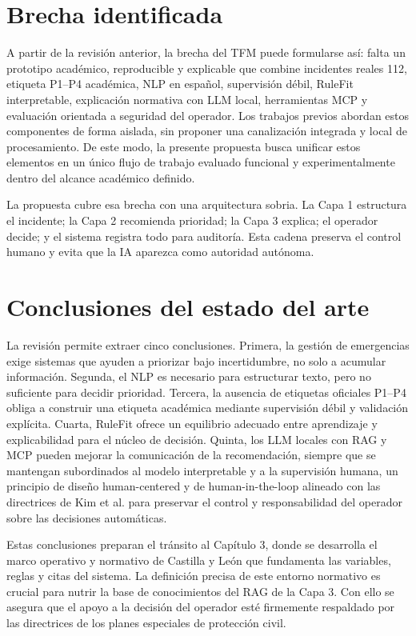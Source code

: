 \section{Brecha identificada}

A partir de la revisión anterior, la brecha del TFM puede formularse así: falta un prototipo académico, reproducible y explicable que combine incidentes reales 112, etiqueta P1--P4 académica, NLP en español, supervisión débil, RuleFit interpretable, explicación normativa con LLM local, herramientas MCP y evaluación orientada a seguridad del operador. Los trabajos previos abordan estos componentes de forma aislada, sin proponer una canalización integrada y local de procesamiento. De este modo, la presente propuesta busca unificar estos elementos en un único flujo de trabajo evaluado funcional y experimentalmente dentro del alcance académico definido.

La propuesta cubre esa brecha con una arquitectura sobria. La Capa 1 estructura el incidente; la Capa 2 recomienda prioridad; la Capa 3 explica; el operador decide; y el sistema registra todo para auditoría. Esta cadena preserva el control humano y evita que la IA aparezca como autoridad autónoma.

\section{Conclusiones del estado del arte}

La revisión permite extraer cinco conclusiones. Primera, la gestión de emergencias exige sistemas que ayuden a priorizar bajo incertidumbre, no solo a acumular información. Segunda, el NLP es necesario para estructurar texto, pero no suficiente para decidir prioridad. Tercera, la ausencia de etiquetas oficiales P1--P4 obliga a construir una etiqueta académica mediante supervisión débil y validación explícita. Cuarta, RuleFit ofrece un equilibrio adecuado entre aprendizaje y explicabilidad para el núcleo de decisión. Quinta, los LLM locales con RAG y MCP pueden mejorar la comunicación de la recomendación, siempre que se mantengan subordinados al modelo interpretable y a la supervisión humana, un principio de diseño human-centered y de human-in-the-loop alineado con las directrices de Kim et al.  para preservar el control y responsabilidad del operador sobre las decisiones automáticas.

Estas conclusiones preparan el tránsito al Capítulo 3, donde se desarrolla el marco operativo y normativo de Castilla y León que fundamenta las variables, reglas y citas del sistema. La definición precisa de este entorno normativo es crucial para nutrir la base de conocimientos del RAG de la Capa 3. Con ello se asegura que el apoyo a la decisión del operador esté firmemente respaldado por las directrices de los planes especiales de protección civil.
